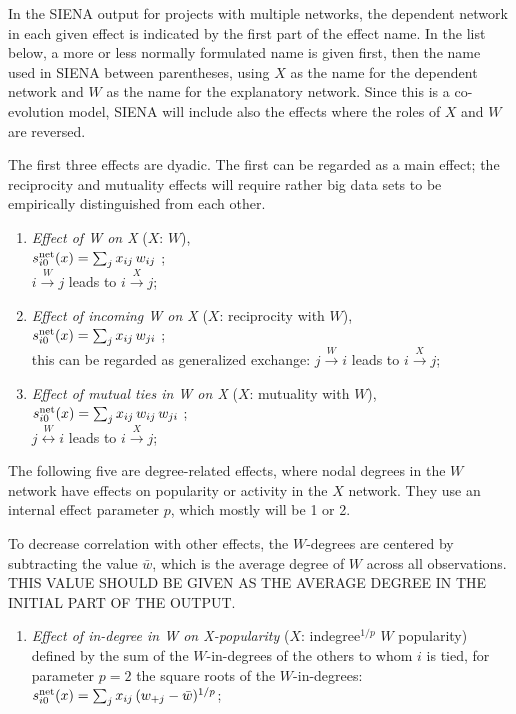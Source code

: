 \documentclass[a4paper,fleqn]{article}
\newcommand{\+}{\, + \,}
\newcommand{\vit}{\theenumi}
\newcommand{\SI}{{\sf SIENA }}
\newcounter{savenumi}
\begin{document}
{In the \SI output for projects with multiple networks,
the dependent network in each given effect is indicated by
the first part of the effect name.
In the list below, a more or less normally formulated name is given first, then the
name used in \SI between parentheses,
using $X$ as the name for the dependent network and $W$
as the name for the explanatory network.
Since this is a co-evolution model, \SI will include also the effects
where the roles of $X$ and $W$ are reversed.

The first three effects are dyadic. The first can be regarded
as a main effect; the reciprocity and mutuality effects
will require rather big data sets to be empirically distinguished
from each other.
\begin{enumerate}
 \item {\em Effect of W on X} ($X$: $W$),\\
 $s^{\rm net}_{i\vit}(x) = \sum_j x_{ij} \, w_{ij}  $ ;\\
 $i \stackrel{W}{\rightarrow} j$ leads to  $i \stackrel{X}{\rightarrow} j$;

 \item {\em Effect of incoming W on X} ($X$: reciprocity with $W$),\\
 $s^{\rm net}_{i\vit}(x) = \sum_j x_{ij} \, w_{ji}  $ ;\\
 this can be regarded as generalized exchange:
 $j \stackrel{W}{\rightarrow} i$ leads to  $i \stackrel{X}{\rightarrow} j$;

 \item {\em Effect of mutual ties in W on X} ($X$: mutuality with $W$),\\
 $s^{\rm net}_{i\vit}(x) = \sum_j x_{ij} \, w_{ij} \, w_{ji}  $ ;\\
 $j \stackrel{W}{\leftrightarrow} i$ leads to  $i \stackrel{X}{\rightarrow} j$;
\setcounter{savenumi}{\value{enumi}}
\end{enumerate}
\smallskip
The following five are degree-related effects, where nodal degrees
in the $W$ network have effects on popularity or activity in the
$X$  network. They use an internal effect parameter $p$, which
mostly will be 1 or 2.

To decrease correlation with other effects, the
$W$-degrees are centered by subtracting the value $\bar w$,
which is the average degree of $W$ across all observations.\\
THIS VALUE SHOULD BE GIVEN AS THE AVERAGE DEGREE IN THE INITIAL PART
OF THE OUTPUT.

\begin{enumerate}
\setcounter{enumi}{\value{savenumi}}
 \item {\em Effect of in-degree in W on X-popularity } ($X$: indegree$^{1/p}$ $W$ popularity)
 defined by   the sum of  the $W$-in-degrees of the others to whom $i$ is tied,
 for parameter $p = 2$ the square roots of the $W$-in-degrees:\\
 $s^{\rm net}_{i\vit}(x) =  \sum_j x_{ij}\, (w_{+j} - \bar w)^{1/p}  $;\\


\end{enumerate}}
\end{document}
